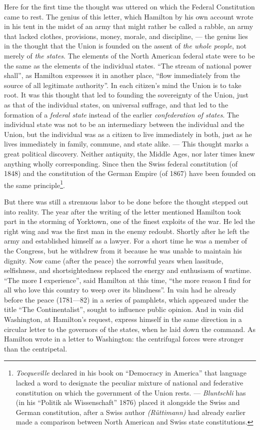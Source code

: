 \documentclass[12pt,a4paper,openany]{book}
\newcommand{\opage}[1]{\marginnote{\footnotesize\textit{[#1]}}}
\begin{document}
Here for the first time the thought was uttered on which
the Federal Constitution came to rest. The genius of this
\opage{128}letter, which Hamilton by his own account wrote in his tent in the midst
of an army that might rather be called a rabble, an army that
lacked clothes, provisions, money, morale, and discipline, ---
the genius lies in the thought that the Union is founded on
the assent of \emph{the whole people}, not merely of \emph{the states}. The elements
of the North American federal state were to be the same as
the elements of the individual states. ``The stream of national power
shall'', as Hamilton expresses it in another place, ``flow
immediately from the source of all legitimate authority''. In each citizen's mind
the Union is to take root. It was this thought that led
to founding the sovereignty of the Union, just as that of the individual states,
on universal suffrage, and that led to the formation of
a \emph{federal state} instead of the earlier \emph{confederation of states}.
The individual state was not to be an intermediary between the individual and
the Union, but the individual was as a citizen to live immediately in
both, just as he lives immediately in family,
commune, and state alike. --- This thought marks a great political
discovery. Neither antiquity, the Middle Ages, nor later
times knew anything wholly corresponding. Since then the Swiss
federal constitution (of 1848) and the constitution of the German Empire
(of 1867) have been founded on the same principle\footnote{\emph{Tocqueville} declared in his book on ``Democracy in America'' that
language lacked a word to designate the peculiar mixture
of national and federative constitution on which the government of the Union rests.
--- \emph{Bluntschli} has (in his ``Politik als Wissenschaft'' 1876)
placed it alongside the Swiss and German constitution, after
a Swiss author \emph{(Rüttimann)} had already earlier made a
comparison between North American and Swiss state constitutions.}.

But there was still a strenuous labor to be done before
the thought stepped out into reality. The year after the
writing of the letter mentioned Hamilton took part in the storming of Yorktown,
one of the finest exploits of the war. He led the right
wing and was the first man in the enemy redoubt. Shortly after
he left the army and established himself as a lawyer. For
a short time he was a member of the Congress, but he withdrew
from it because he was unable to maintain his dignity.
Now came (after the peace) the sorrowful years when lassitude,
selfishness, and shortsightedness replaced the energy and enthusiasm of wartime.
\opage{129}``The more I experience'', said Hamilton at this time, ``the
more reason I find for all who love this country to
weep over its blindness''. In vain had he already
before the peace (1781---82) in a series of pamphlets, which appeared
under the title ``The Continentalist'', sought to influence
public opinion. And in vain did Washington, at
Hamilton's request, express himself in the same direction in a circular
letter to the governors of the states, when he laid down the command. As
Hamilton wrote in a letter to Washington: the centrifugal
forces were stronger than the centripetal.
\end{document}

